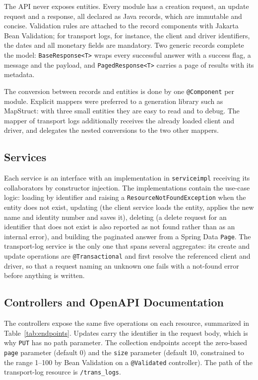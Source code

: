 The API never exposes entities. Every module has a creation request, an update request and a response, all declared as Java records, which are immutable and concise. Validation rules are attached to the record components with Jakarta Bean Validation; for transport logs, for instance, the client and driver identifiers, the dates and all monetary fields are mandatory. Two generic records complete the model: \texttt{BaseResponse<T>} wraps every successful answer with a success flag, a message and the payload, and \texttt{PagedResponse<T>} carries a page of results with its metadata.


The conversion between records and entities is done by one \texttt{@Component} per module. Explicit mappers were preferred to a generation library such as MapStruct: with three small entities they are easy to read and to debug. The mapper of transport logs additionally receives the already loaded client and driver, and delegates the nested conversions to the two other mappers.


\subsection{Services}

Each service is an interface with an implementation in \texttt{serviceimpl} receiving its collaborators by constructor injection. The implementations contain the use-case logic: loading by identifier and raising a \texttt{ResourceNotFoundException} when the entity does not exist, updating (the client service loads the entity, applies the new name and identity number and saves it), deleting (a delete request for an identifier that does not exist is also reported as not found rather than as an internal error), and building the paginated answer from a Spring Data \texttt{Page}. The transport-log service is the only one that spans several aggregates: its create and update operations are \texttt{@Transactional} and first resolve the referenced client and driver, so that a request naming an unknown one fails with a not-found error before anything is written.


\subsection{Controllers and OpenAPI Documentation}

The controllers expose the same five operations on each resource, summarized in Table~\ref{tab:endpoints}. Updates carry the identifier in the request body, which is why \texttt{PUT} has no path parameter. The collection endpoints accept the zero-based \texttt{page} parameter (default 0) and the \texttt{size} parameter (default 10, constrained to the range 1--100 by Bean Validation on a \texttt{@Validated} controller). The path of the transport-log resource is \texttt{/trans\_logs}.

